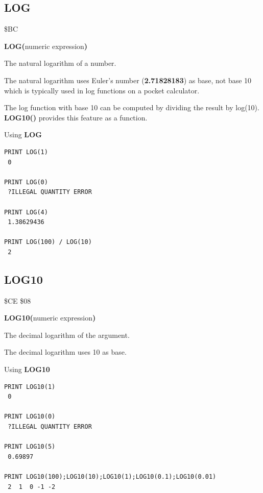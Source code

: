 
\newpage
\subsection{LOG}
\begin{description}[leftmargin=2cm,style=nextline]
\item [Token:] \$BC
\item [Format:] {\bf LOG(}numeric expression{\bf)}
\item [Returns:] The natural logarithm of a number.

               The natural logarithm uses
               Euler's number ({\bf 2.71828183}) as base,
               not base 10 which is typically used
               in log functions on a pocket calculator.

\item [Remarks:] The log function with base 10 can be computed
                 by dividing the result by log(10). {\bf LOG10()}
                 provides this feature as a function.
\item [Example:] Using {\bf LOG}
\begin{tcolorbox}[colback=black,coltext=white]
\verbatimfont{\codefont}
\begin{verbatim}
PRINT LOG(1)
 0

PRINT LOG(0)
 ?ILLEGAL QUANTITY ERROR

PRINT LOG(4)
 1.38629436

PRINT LOG(100) / LOG(10)
 2
\end{verbatim}
\end{tcolorbox}
\end{description}


\newpage
\subsection{LOG10}
\begin{description}[leftmargin=2cm,style=nextline]
\item [Token:] \$CE \$08
\item [Format:] {\bf LOG10(}numeric expression{\bf)}
\item [Returns:] The decimal logarithm of the argument.

               The decimal logarithm uses 10 as base.

\item [Example:] Using {\bf LOG10}
\begin{tcolorbox}[colback=black,coltext=white]
\verbatimfont{\codefont}
\begin{verbatim}
PRINT LOG10(1)
 0

PRINT LOG10(0)
 ?ILLEGAL QUANTITY ERROR

PRINT LOG10(5)
 0.69897

PRINT LOG10(100);LOG10(10);LOG10(1);LOG10(0.1);LOG10(0.01)
 2  1  0 -1 -2
\end{verbatim}
\end{tcolorbox}
\end{description}

